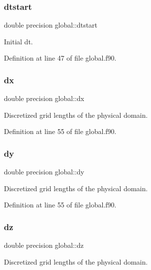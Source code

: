 \subsubsection{\texorpdfstring{dtstart}{dtstart}}
{\footnotesize\ttfamily double precision global\+::dtstart}



Initial dt. 



Definition at line 47 of file global.\+f90.

\mbox{\label{namespaceglobal_a9c5f8c3cf5f9b496608059fc13776b4c}} 
\subsubsection{\texorpdfstring{dx}{dx}}
{\footnotesize\ttfamily double precision global\+::dx}



Discretized grid lengths of the physical domain. 



Definition at line 55 of file global.\+f90.

\mbox{\label{namespaceglobal_aa2d01c0b9c06af88ae13136658fc3dd9}} 
\subsubsection{\texorpdfstring{dy}{dy}}
{\footnotesize\ttfamily double precision global\+::dy}



Discretized grid lengths of the physical domain. 



Definition at line 55 of file global.\+f90.

\mbox{\label{namespaceglobal_a4015487c561985eefa8cabc39f591540}} 
\subsubsection{\texorpdfstring{dz}{dz}}
{\footnotesize\ttfamily double precision global\+::dz}



Discretized grid lengths of the physical domain. 



